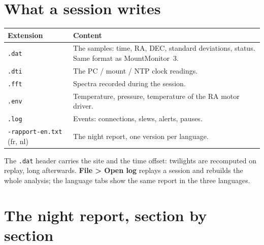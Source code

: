 \section{What a session writes}

\begin{center}
\begin{tabularx}{\textwidth}{lX}
\toprule
\textbf{Extension} & \textbf{Content} \\
\midrule
\texttt{.dat} & The samples: time, RA, DEC, standard deviations, status. Same
format as MountMonitor~3. \\
\texttt{.dti} & The PC / mount / NTP clock readings. \\
\texttt{.fft} & Spectra recorded during the session. \\
\texttt{.env} & Temperature, pressure, temperature of the RA motor driver. \\
\texttt{.log} & Events: connections, slews, alerts, pauses. \\
\texttt{-rapport-en.txt} (fr, nl) & The night report, one version per
language. \\
\bottomrule
\end{tabularx}
\end{center}

The \texttt{.dat} header carries the site and the time offset: twilights are
recomputed on replay, long afterwards. \textbf{File > Open log} replays a
session and rebuilds the whole analysis; the language tabs show the same report
in the three languages.

\needspace{0.6\textheight}
\section{The night report, section by section}
\label{sec:report}


